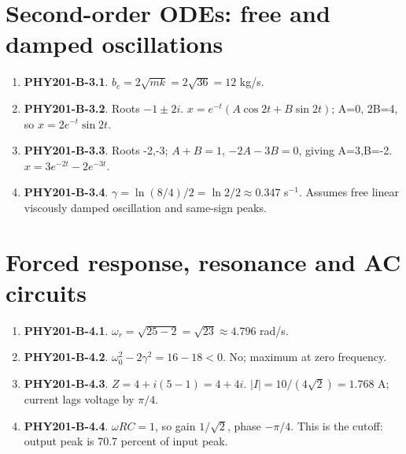 \documentclass[11pt,a4paper,openany]{book}
\begin{document}
\section{Second-order ODEs: free and damped oscillations}
\begin{enumerate}
\item \textbf{PHY201-B-3.1}. $b_c=2\sqrt{mk}=2\sqrt{36}=12$ kg/s.
\item \textbf{PHY201-B-3.2}. Roots $-1\pm2i$. $x=e^{-t}(A\cos2t+B\sin2t)$; A=0, 2B=4, so $x=2e^{-t}\sin2t$.
\item \textbf{PHY201-B-3.3}. Roots -2,-3; $A+B=1$, $-2A-3B=0$, giving A=3,B=-2. $x=3e^{-2t}-2e^{-3t}$.
\item \textbf{PHY201-B-3.4}. $\gamma=\ln(8/4)/2=\ln2/2\approx0.347$ s$^{-1}$. Assumes free linear viscously damped oscillation and same-sign peaks.
\end{enumerate}
\section{Forced response, resonance and AC circuits}
\begin{enumerate}
\item \textbf{PHY201-B-4.1}. $\omega_r=\sqrt{25-2}=\sqrt{23}\approx4.796$ rad/s.
\item \textbf{PHY201-B-4.2}. $\omega_0^2-2\gamma^2=16-18<0$. No; maximum at zero frequency.
\item \textbf{PHY201-B-4.3}. $Z=4+i(5-1)=4+4i$. $|I|=10/(4\sqrt2)=1.768$ A; current lags voltage by $\pi/4$.
\item \textbf{PHY201-B-4.4}. $\omega RC=1$, so gain $1/\sqrt2$, phase $-\pi/4$. This is the cutoff: output peak is 70.7 percent of input peak.
\end{enumerate}
\end{document}
